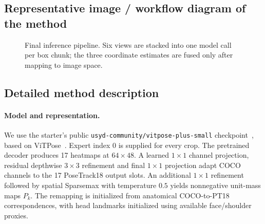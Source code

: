 \documentclass[a4paper,10pt,conference]{ieeeconf}
\begin{document}
\subsection{Representative image / workflow diagram of the method}
\begin{figure}[ht]
\centering
\setlength{\fboxsep}{5pt}
\caption{Final inference pipeline. Six views are stacked into one model call per box chunk; the three coordinate estimates are fused only after mapping to image space.}
\label{fig:pipeline}
\end{figure}

\subsection{Detailed method description}
\paragraph{Model and representation.}
We use the starter's public \texttt{usyd-community/vitpose-plus-small} checkpoint~\cite{startermodel}, based on ViTPose~\cite{xu2022vitpose}. Expert index 0 is supplied for every crop. The pretrained decoder produces 17 heatmaps at $64\!\times\!48$. A learned $1\!\times\!1$ channel projection, residual depthwise $3\!\times\!3$ refinement and final $1\!\times\!1$ projection adapt COCO channels to the 17 PoseTrack18 output slots. An additional $1\!\times\!1$ refinement followed by spatial Sparsemax with temperature $0.5$ yields nonnegative unit-mass maps $P_k$. The remapping is initialized from anatomical COCO-to-PT18 correspondences, with head landmarks initialized using available face/shoulder proxies.
\end{document}
